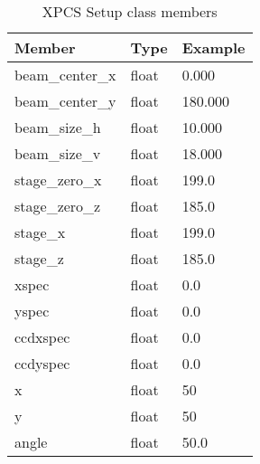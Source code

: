 \begin{table}[h!]\sffamily \footnotesize
\caption{XPCS Setup class members}

\begin{tabular}{p{4.5cm} p{3.5cm}  p{3.5cm} }

\toprule
\bfseries Member     & \bfseries Type & \bfseries Example \\
\midrule
beam\_center\_x & float & 0.000 \\   
beam\_center\_y & float & 180.000 \\     
beam\_size\_h & float & 10.000 \\    
beam\_size\_v & float & 18.000 \\    
stage\_zero\_x & float & 199.0 \\    
stage\_zero\_z & float & 185.0 \\    
stage\_x & float & 199.0 \\  
stage\_z & float & 185.0 \\ 
xspec & float & 0.0 \\   
yspec & float & 0.0 \\  
ccdxspec & float & 0.0 \\    
ccdyspec & float & 0.0 \\   
x & float & 50 \\
y & float & 50 \\
angle & float & 50.0 \\
\bottomrule
\end{tabular}
\end{table}













